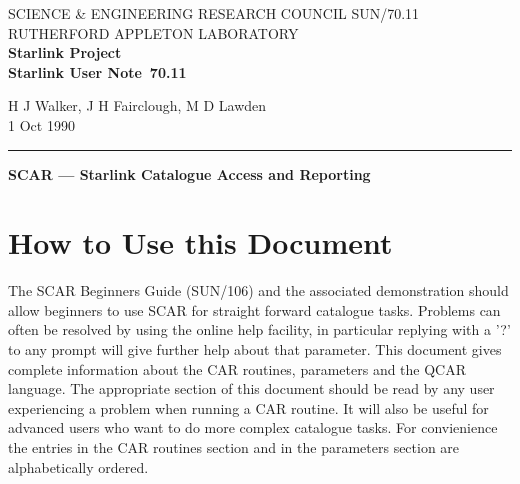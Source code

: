 \pagestyle{myheadings}

\newcommand{\stardoccategory}  {Starlink User Note}
\newcommand{\stardocinitials}  {SUN}
\newcommand{\stardocnumber}    {70.11}
\newcommand{\stardocauthors}   {H J Walker, J H Fairclough, M D Lawden}
\newcommand{\stardocdate}      {1 Oct 1990}
\newcommand{\stardoctitle}     {SCAR --- Starlink Catalogue Access and Reporting}

\newcommand{\stardocname}{\stardocinitials /\stardocnumber}
\markright{\stardocname}
\setlength{\textwidth}{160mm}
\setlength{\textheight}{240mm}
\setlength{\topmargin}{-5mm}
\setlength{\oddsidemargin}{0mm}
\setlength{\evensidemargin}{0mm}
\setlength{\parindent}{0mm}
\setlength{\parskip}{\medskipamount}
\setlength{\unitlength}{1mm}


\thispagestyle{empty}
SCIENCE \& ENGINEERING RESEARCH COUNCIL \hfill \stardocname\\
RUTHERFORD APPLETON LABORATORY\\
{\large\bf Starlink Project\\}
{\large\bf \stardoccategory\ \stardocnumber}
\begin{flushright}
\stardocauthors\\
\stardocdate
\end{flushright}
\vspace{-4mm}
\rule{\textwidth}{0.5mm}
\vspace{5mm}
\begin{center}
{\Large\bf \stardoctitle}
\end{center}
\vspace{5mm}

\setlength{\parskip}{0mm}
\tableofcontents
\setlength{\parskip}{\medskipamount}
\markright{\stardocname}
\newpage

\section {How to Use this Document}

The SCAR Beginners Guide (SUN/106) and the associated demonstration should allow
beginners to use SCAR for straight forward catalogue tasks. Problems can
often be resolved by using the online help facility, in particular replying
with a '?' to any prompt will give further help about that parameter. This
document gives complete information about the CAR routines, parameters and
the QCAR language. The appropriate section of this document should be read
by any user
experiencing a problem when running a CAR routine. It will also be useful for
advanced users who want to
do more complex catalogue tasks. For convienience the entries in the CAR
routines section and in the parameters section are alphabetically ordered.

